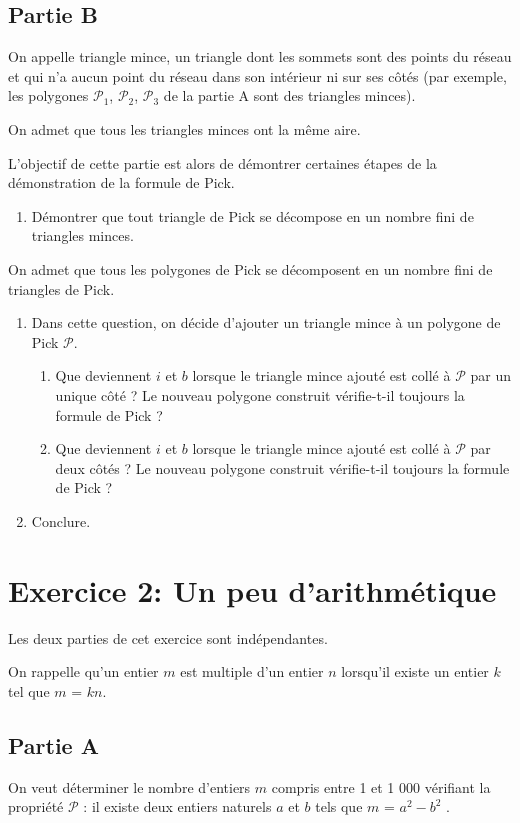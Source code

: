 \documentclass[a4paper,12pt, noSujetB]{article}
\begin{document}
\subsection*{Partie B}
On appelle triangle mince, un triangle dont les sommets sont des points du réseau et qui n'a aucun point du réseau dans son intérieur ni sur ses côtés (par exemple, les polygones $\mathcal{P}_1$, $\mathcal{P}_2$, $\mathcal{P}_3$ de la partie A sont des triangles minces).

On admet que tous les triangles minces ont la même aire.

L'objectif de cette partie est alors de démontrer certaines étapes de la démonstration de la formule de Pick.

\begin{enumerate}
    \item
    Démontrer que tout triangle de Pick se décompose en un nombre fini de triangles minces.
\end{enumerate}
On admet que tous les polygones de Pick se décomposent en un nombre fini de triangles de Pick.
\begin{enumerate}[resume]
    \item
    Dans cette question, on décide d'ajouter un triangle mince à un polygone de Pick $\mathcal{P}$.
    \begin{enumerate}[label=\alph*.]
        \item
        Que deviennent $i$ et $b$ lorsque le triangle mince ajouté est collé à $\mathcal{P}$ par un unique côté ?
        Le nouveau polygone construit vérifie-t-il toujours la formule de Pick ?
        \item
        Que deviennent $i$ et $b$ lorsque le triangle mince ajouté est collé à $\mathcal{P}$ par deux côtés ?
        Le nouveau polygone construit vérifie-t-il toujours la formule de Pick ?
    \end{enumerate}
    \item
    Conclure.
\end{enumerate}


\section*{Exercice 2: Un peu d'arithmétique}

Les deux parties de cet exercice sont indépendantes.

On rappelle qu'un entier $m$ est multiple d'un entier $n$ lorsqu'il existe un entier $k$ tel que $m$ = $kn$.

\subsection*{Partie A}
On veut déterminer le nombre d'entiers $m$ compris entre 1 et 1 000 vérifiant la propriété $\mathcal{P}$ : \og il existe deux entiers naturels $a$ et $b$ tels que $m$ = $a^2-b^2$ \fg{}.
\end{document}
